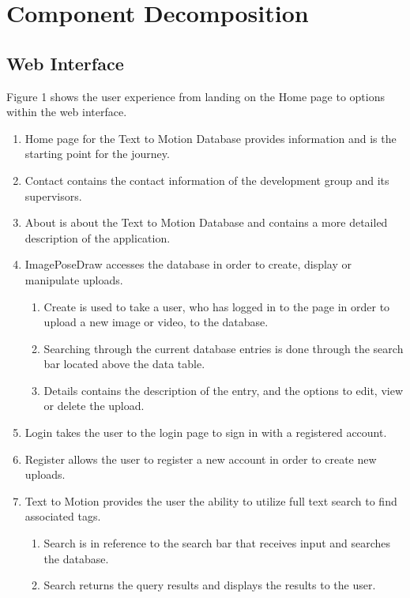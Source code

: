 \documentclass{scrreprt}
\begin{document}
\chapter{Component Decomposition}

\section{Web Interface}

Figure 1 shows the user experience from landing on the Home page to options
within the web interface.

\begin{enumerate}
  \item Home page for the Text to Motion Database provides information and is
          the starting point for the journey.
  \item Contact contains the contact information of the development group and
          its supervisors.
  \item About is about the Text to Motion Database and contains a more detailed
          description of the application.
  \item ImagePoseDraw accesses the database in order to create, display or
          manipulate uploads.

\begin{enumerate}
    \item Create is used to take a user, who has logged in to the page in order
            to upload a new image or video, to the database.
    \item Searching through the current database entries is done through the
            search bar located above the data table.
    \item Details contains the description of the entry, and the options to
            edit, view or delete the upload.
\end{enumerate}

  \item Login takes the user to the login page to sign in with a registered
          account.
  \item Register allows the user to register a new account in order to create
          new uploads.
  \item Text to Motion provides the user the ability to utilize full text
          search to find associated tags.

\begin{enumerate}
    \item Search is in reference to the search bar that receives input and
            searches the database.
    \item Search returns the query results and displays the results to the
            user.
\end{enumerate}
\end{enumerate}
\end{document}
